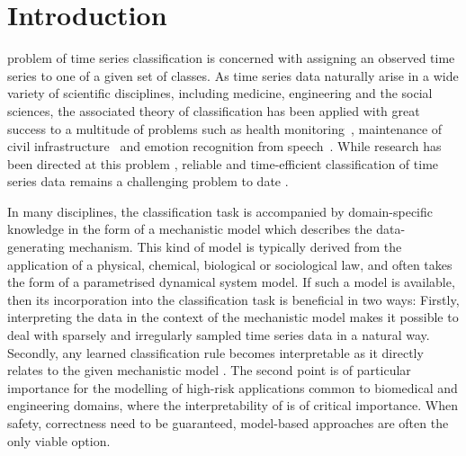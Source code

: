 \section{Introduction}

 problem of time series classification is concerned with assigning an observed time series to one of a given set of classes. 
As time series data naturally arise in a wide variety of scientific disciplines, including medicine, engineering and the social sciences, the associated theory of classification has been applied with great success to a multitude of problems such as health monitoring~\cite{mikalsen2016learning}, maintenance of civil infrastructure~\cite{carden2008ARMA} and emotion recognition from speech~\cite{trentin2015pattern}. 
While research has been directed at this problem , reliable and time-efficient classification of time series data remains a challenging problem to date \cite{pei2018multivariate, bianchi2021reservoir, Bradde2021multiclass}.

In many disciplines, the classification task is accompanied by domain-specific knowledge in the form of a mechanistic model which describes the data-generating mechanism.
This kind of model is typically derived from the application of a physical, chemical, biological or sociological law, and often takes the form of a parametrised dynamical system model.
If such a model is available, then its incorporation into the classification task is beneficial in two ways: 
Firstly, interpreting the data in the context of the mechanistic model makes it possible to deal with sparsely and irregularly sampled time series data in a natural way.
Secondly, any learned classification rule becomes interpretable as it directly relates to the given mechanistic model \cite{shen2017classification}.  
The second point is of particular importance for the modelling of high-risk applications common to biomedical and engineering domains, where the interpretability of  is of critical importance.
When safety, correctness  need to be guaranteed, model-based approaches are often the only viable option.

